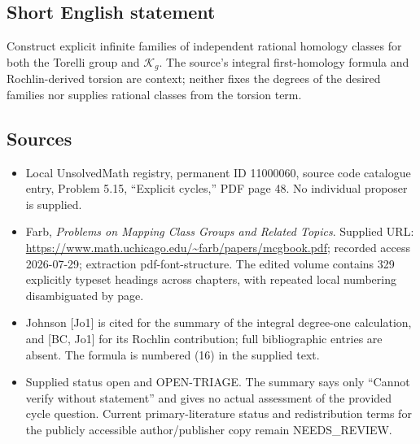 \documentclass[11pt]{article}
\begin{document}
\subsection{Short English statement}
Construct explicit infinite families of independent rational homology classes for both the Torelli group and \(\mathcal K_g\). The source's integral first-homology formula and Rochlin-derived torsion are context; neither fixes the degrees of the desired families nor supplies rational classes from the torsion term.
\subsection{Sources}
\begin{itemize}
\item Local UnsolvedMath registry, permanent ID 11000060, source code catalogue entry, Problem 5.15, ``Explicit cycles,'' PDF page 48. No individual proposer is supplied.
\item Farb, \emph{Problems on Mapping Class Groups and Related Topics}. Supplied URL: \url{https://www.math.uchicago.edu/~farb/papers/mcgbook.pdf}; recorded access 2026-07-29; extraction pdf-font-structure. The edited volume contains 329 explicitly typeset headings across chapters, with repeated local numbering disambiguated by page.
\item Johnson [Jo1] is cited for the summary of the integral degree-one calculation, and [BC, Jo1] for its Rochlin contribution; full bibliographic entries are absent. The formula is numbered (16) in the supplied text.
\item Supplied status open and OPEN-TRIAGE. The summary says only ``Cannot verify without statement'' and gives no actual assessment of the provided cycle question. Current primary-literature status and redistribution terms for the publicly accessible author/publisher copy remain NEEDS\_REVIEW.
\end{itemize}
\end{document}
